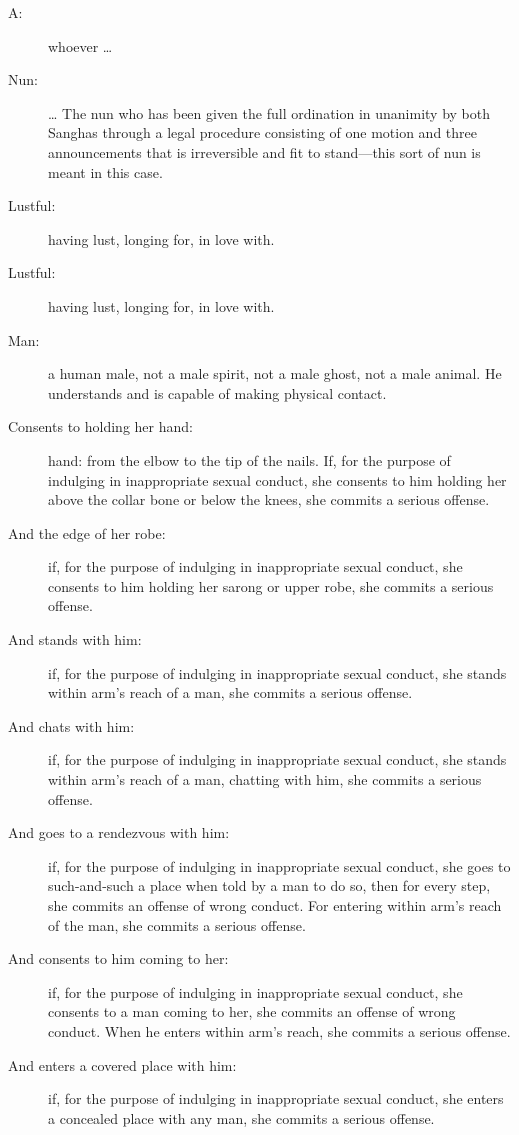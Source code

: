 \documentclass[12pt,openany]{book}%
\begin{document}
\begin{description}%
\item[A: ] whoever … %
\item[Nun: ] … The nun who has been given the full ordination in unanimity by both Sanghas through a legal procedure consisting of one motion and three announcements that is irreversible and fit to stand—this sort of nun is meant in this case. %
\item[Lustful: ] having lust, longing for, in love with. %
\item[Lustful: ] having lust, longing for, in love with. %
\item[Man: ] a human male, not a male spirit, not a male ghost, not a male animal. He understands and is capable of making physical contact. %
\item[Consents to holding her hand: ] hand: from the elbow to the tip of the nails. If, for the purpose of indulging in inappropriate sexual conduct, she consents to him holding her above the collar bone or below the knees, she commits a serious offense. %
\item[And the edge of her robe: ] if, for the purpose of indulging in inappropriate sexual conduct, she consents to him holding her sarong or upper robe, she commits a serious offense. %
\item[And stands with him: ] if, for the purpose of indulging in inappropriate sexual conduct, she stands within arm’s reach of a man, she commits a serious offense. %
\item[And chats with him: ] if, for the purpose of indulging in inappropriate sexual conduct, she stands within arm’s reach of a man, chatting with him, she commits a serious offense. %
\item[And goes to a rendezvous with him: ] if, for the purpose of indulging in inappropriate sexual conduct, she goes to such-and-such a place when told by a man to do so, then for every step, she commits an offense of wrong conduct. For entering within arm’s reach of the man, she commits a serious offense. %
\item[And consents to him coming to her: ] if, for the purpose of indulging in inappropriate sexual conduct, she consents to a man coming to her, she commits an offense of wrong conduct. When he enters within arm’s reach, she commits a serious offense. %
\item[And enters a covered place with him: ] if, for the purpose of indulging in inappropriate sexual conduct, she enters a concealed place with any man, she commits a serious offense. %

\end{description}
\end{document}
